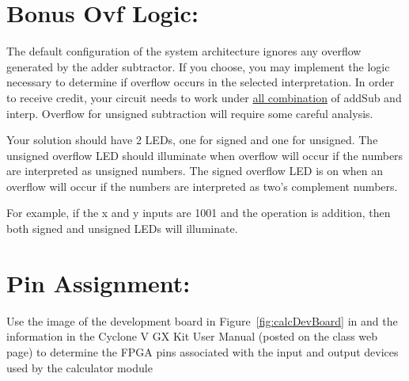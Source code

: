 \hypertarget{section}{%
\section{}\label{section}}

\hypertarget{bonus-ovf-logic}{%
\section{Bonus Ovf Logic:}\label{bonus-ovf-logic}}

The default configuration of the system architecture ignores any
overflow generated by the adder subtractor. If you choose, you may
implement the logic necessary to determine if overflow occurs in the
selected interpretation. In order to receive credit, your circuit needs
to work under \uline{all combination} of addSub and interp. Overflow for
unsigned subtraction will require some careful analysis.

Your solution should have 2 LEDs, one for signed and one for unsigned.
The unsigned overflow LED should illuminate when overflow will occur if
the numbers are interpreted as unsigned numbers. The signed overflow LED
is on when an overflow will occur if the numbers are interpreted as
two's complement numbers.

For example, if the x and y inputs are 1001 and the operation is
addition, then both signed and unsigned LEDs will illuminate.

\hypertarget{pin-assignment}{%
\section{Pin Assignment:}\label{pin-assignment}}

Use the image of the development board in Figure~\ref{fig:calcDevBoard} in and the
information in the Cyclone V GX Kit User Manual (posted on the class web
page) to determine the FPGA pins associated with the input and output
devices used by the calculator module

